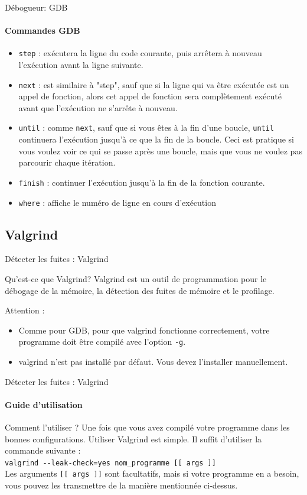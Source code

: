 \begin{frame}{Débogueur: GDB}
	\framesubtitle{Commandes GDB}
	\begin{itemize}
		\item \alert{\texttt{step}} : exécutera la ligne du code courante, puis arrêtera à nouveau l'exécution avant la ligne suivante.
		\item \alert{\texttt{next}} : est similaire à "step", sauf que si la ligne qui va être exécutée est un appel de fonction, alors cet appel de fonction sera complètement exécuté avant que l'exécution ne s'arrête à nouveau.
		\item \alert{\texttt{until}} : comme \alert{\texttt{next}}, sauf que si vous êtes à la fin d'une boucle, \alert{\texttt{until}} continuera l'exécution jusqu'à ce que la fin de la boucle. Ceci est pratique si vous voulez voir ce qui se passe après une boucle, mais que vous ne voulez pas parcourir chaque itération.
		\item \alert{\texttt{finish}} : continuer l'exécution jusqu'à la fin de la fonction courante.
		\item \alert{\texttt{where}} : affiche le numéro de ligne en cours d'exécution
	\end{itemize}
\end{frame}

\subsection{Valgrind}
\begin{frame}{Détecter les fuites : Valgrind}
	\begin{block}{Qu'est-ce que Valgrind?}
		Valgrind est un outil de programmation pour le débogage de la mémoire, la détection des fuites de mémoire et le profilage.
	\end{block}
	\begin{alertblock}{Attention : }
		\begin{itemize}
			\item Comme pour GDB, pour que valgrind fonctionne correctement, votre programme doit être compilé avec l'option \alert{\texttt{-g}}.
			\item valgrind n'est pas installé par défaut. Vous devez l'installer manuellement.
		\end{itemize}
	\end{alertblock}
\end{frame}

\begin{frame}{Détecter les fuites : Valgrind}
	\framesubtitle{Guide d'utilisation}
	\begin{block}{Comment l'utiliser ?}
		Une fois que vous avez compilé votre programme dans les bonnes configurations. Utiliser Valgrind est simple. Il suffit d'utiliser la commande suivante : \\ 
		\alert{\texttt{valgrind -{}-leak-check=yes nom\_programme [[ args ]]}} \\
		Les arguments \texttt{[[ args ]]} sont facultatifs, mais si votre programme en a besoin, vous pouvez les transmettre de la manière mentionnée ci-dessus.
	\end{block}
\end{frame}

